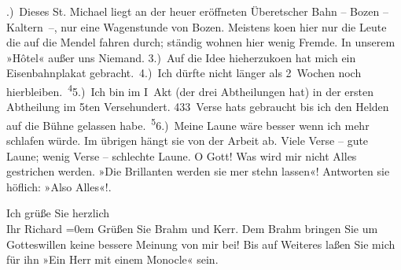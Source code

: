.) Dieses St. Michael liegt an der heuer
               eröffneten Überetscher Bahn – Bozen – Kaltern –, nur
               eine Wagenstunde von Bozen. Meistens ko{\geminationm}en hier nur die Leute die auf die Mendel fahren durch; ständig wohnen hier wenig Fremde. In
               unserem »Hôtel« außer uns Niemand. 3.) Auf die
               Idee hieherzuko{\geminationm}en hat mich ein Eisenbahnplakat
               gebracht. 4.) Ich dürfte nicht länger als 2 Wochen noch hierbleiben. \substVorne{}\textsuperscript{4}\substDazwischen{}5\substHinten{}.) Ich bin im I Akt
               (der drei Abtheilungen hat) in der ersten Abtheilung im 5ten Versehundert. 433 Verse hats gebraucht bis
               ich den Helden auf die Bühne gelassen habe. \substVorne{}\textsuperscript{5}\substDazwischen{}6\substHinten{}.) Meine Laune wäre besser {\pb}wenn ich mehr schlafen würde. Im übrigen hängt sie von der Arbeit ab. Viele Verse –
               gute Laune; wenig Verse – schlechte Laune. O Gott! Was wird mir nicht Alles
               gestrichen werden. »Die Brillanten werden sie mer stehn lassen«! Antworten sie
               höflich: »Also Alles«!.\pend
           
\pstart
            Ich grüße Sie herzlich{\\[\baselineskip]}Ihr \spacefill\mbox{Richard}\pend
           \leftskip=0em{}
\pstart
           \noindent{}Grüßen Sie Brahm und Kerr. Dem Brahm bringen Sie um Gotteswillen keine
                  bessere Meinung von mir bei! Bis auf Weiteres laßen Sie mich für ihn »Ein Herr mit
                  einem Monocle« sein.\pend
           \endnumbering{}  
      